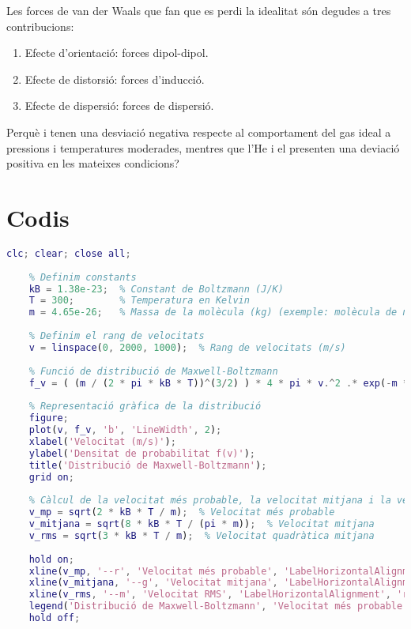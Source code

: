 Les forces de van der Waals que fan que es perdi la idealitat són degudes a tres contribucions:
\begin{enumerate}
\item Efecte d'orientació: forces dipol-dipol.
\item Efecte de distorsió: forces d'inducció.
\item Efecte de dispersió: forces de dispersió.
\end{enumerate}

\begin{exr}
Perquè  i  tenen una desviació negativa respecte al comportament del gas ideal a pressions i temperatures moderades, mentres que l'He i el  presenten una deviació positiva en les mateixes condicions?
\end{exr}

\newpage
\section{Codis}

\begin{lstlisting}[language=Matlab, caption={Codi Matlab per dibuixar una distribució de Maxwell-Boltzmann}]
    clc; clear; close all;
    
    % Definim constants
    kB = 1.38e-23;  % Constant de Boltzmann (J/K)
    T = 300;        % Temperatura en Kelvin
    m = 4.65e-26;   % Massa de la molècula (kg) (exemple: molècula de nitrogen)
    
    % Definim el rang de velocitats
    v = linspace(0, 2000, 1000);  % Rang de velocitats (m/s)
    
    % Funció de distribució de Maxwell-Boltzmann
    f_v = ( (m / (2 * pi * kB * T))^(3/2) ) * 4 * pi * v.^2 .* exp(-m * v.^2 / (2 * kB * T));
    
    % Representació gràfica de la distribució
    figure;
    plot(v, f_v, 'b', 'LineWidth', 2);
    xlabel('Velocitat (m/s)');
    ylabel('Densitat de probabilitat f(v)');
    title('Distribució de Maxwell-Boltzmann');
    grid on;
    
    % Càlcul de la velocitat més probable, la velocitat mitjana i la velocitat quadràtica mitjana
    v_mp = sqrt(2 * kB * T / m);  % Velocitat més probable
    v_mitjana = sqrt(8 * kB * T / (pi * m));  % Velocitat mitjana
    v_rms = sqrt(3 * kB * T / m);  % Velocitat quadràtica mitjana
    
    hold on;
    xline(v_mp, '--r', 'Velocitat més probable', 'LabelHorizontalAlignment', 'right');
    xline(v_mitjana, '--g', 'Velocitat mitjana', 'LabelHorizontalAlignment', 'right');
    xline(v_rms, '--m', 'Velocitat RMS', 'LabelHorizontalAlignment', 'right');
    legend('Distribució de Maxwell-Boltzmann', 'Velocitat més probable', 'Velocitat mitjana', 'Velocitat RMS');
    hold off;
    \end{lstlisting}